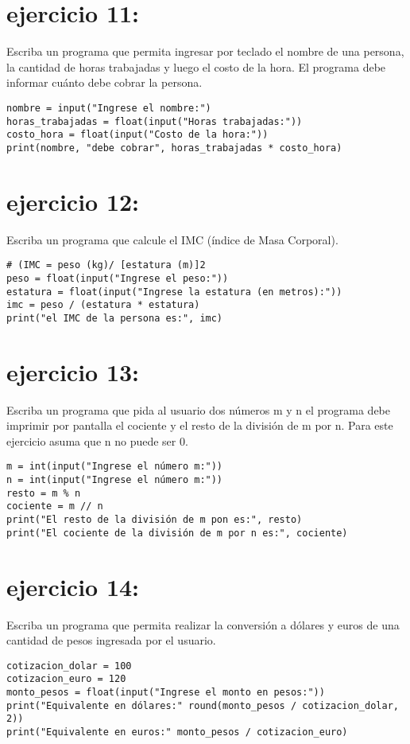 \documentclass[11pt]{article}
\begin{document}
\section{ejercicio 11:}
\label{sec:orgdc003e9}
Escriba un programa que permita ingresar por teclado el nombre
de una persona, la cantidad de horas trabajadas y luego el costo de
la hora. El programa debe informar cuánto debe cobrar la persona.
\begin{verbatim}
nombre = input("Ingrese el nombre:")
horas_trabajadas = float(input("Horas trabajadas:"))
costo_hora = float(input("Costo de la hora:"))
print(nombre, "debe cobrar", horas_trabajadas * costo_hora)
\end{verbatim}
\section{ejercicio 12:}
\label{sec:orgee5faaa}
Escriba un programa que calcule el IMC (índice de Masa Corporal).
\begin{verbatim}
# (IMC = peso (kg)/ [estatura (m)]2
peso = float(input("Ingrese el peso:"))
estatura = float(input("Ingrese la estatura (en metros):"))
imc = peso / (estatura * estatura)
print("el IMC de la persona es:", imc)
\end{verbatim}
\section{ejercicio 13:}
\label{sec:orgb07ca24}
Escriba un programa que pida al usuario dos números m y
n el programa debe imprimir por pantalla el cociente y el resto de la
división de m por n. Para este ejercicio asuma que n no puede ser 0.
\begin{verbatim}
m = int(input("Ingrese el número m:"))
n = int(input("Ingrese el número m:"))
resto = m % n
cociente = m // n
print("El resto de la división de m pon es:", resto)
print("El cociente de la división de m por n es:", cociente)
\end{verbatim}
\section{ejercicio 14:}
\label{sec:orga6a28cc}
Escriba un programa que permita realizar la conversión a
dólares y euros de una cantidad de pesos ingresada por el usuario.
\begin{verbatim}
cotizacion_dolar = 100
cotizacion_euro = 120
monto_pesos = float(input("Ingrese el monto en pesos:"))
print("Equivalente en dólares:" round(monto_pesos / cotizacion_dolar, 2))
print("Equivalente en euros:" monto_pesos / cotizacion_euro)
\end{verbatim}
\end{document}
